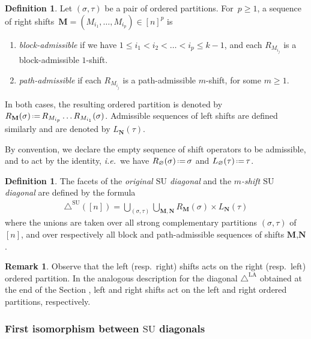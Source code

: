 \documentclass{amsart}
\newcommand{\darkblue}{\color{darkblue}} %
\newcommand{\Guillaume}[1]{\todo[color=magenta!30]{\rm #1 \\ \hfill --- G.}}
\theoremstyle{definition}
\newtheorem{definition}[theorem]{Definition}
\newtheorem{remark}[theorem]{Remark}
\newcommand{\eqdef}{\mbox{\,\raisebox{0.2ex}{\scriptsize\ensuremath{\mathrm:}}\ensuremath{=}\,}} %
\newcommand{\ie}{\textit{i.e.}~} %
\newcommand{\defn}[1]{\textsl{\darkblue #1}} %
\newcommand{\SU}{\mathrm{SU}}
\newcommand{\SUD}{\triangle^{\mathrm{SU}}}
\newcommand{\LAD}{\triangle^{\mathrm{LA}}}
\begin{document}
\begin{definition}
\label{def:admissible-shift-sequences}
Let $(\sigma,\tau)$ be a pair of ordered partitions. 
For~$p\geq 1$, a sequence of right shifts~$\textbf{M} = (M_{i_1},\dots,M_{i_p}) \in [n]^{p}$ is 
\begin{enumerate}
    \item \defn{block-admissible} if we have $1\leq i_1 < i_2 < \dots < i_p \leq k-1$, and each $R_{M_{i_j}}$ is a block-admissible $1$-shift.
    \item \defn{path-admissible} if each $R_{M_{i_j}}$ is a path-admissible $m$-shift, for some $m\geq 1$.
\end{enumerate}
In both cases, the resulting ordered partition is denoted by $R_\mathbf{M}(\sigma) \eqdef R_{M_{i_p}}\dots R_{M_{i_1}}(\sigma)$.
Admissible sequences of left shifts are defined similarly and are denoted by $L_\mathbf{N}(\tau)$.
\end{definition}

By convention, we declare the empty sequence of shift operators to be admissible, and to act by the identity, \ie we have $R_{\mathbf{\varnothing}}(\sigma)  \eqdef  \sigma$ and $L_{\mathbf{\varnothing}} (\tau) \eqdef  \tau$.

\begin{definition}
\label{def:classical-SU}
The facets of the \defn{original $\SU$ diagonal} and the \defn{$m$-shift $\SU$ diagonal} are defined by the formula
    \begin{align*}
        \SUD([n]) = \bigcup_{(\sigma,\tau)} \bigcup_{\mathbf{M}, \mathbf{N}} R_\mathbf{M}(\sigma)\times L_\mathbf{N}(\tau)
    \end{align*}
where the unions are taken over all strong complementary partitions $(\sigma, \tau)$ of $[n]$, and over respectively all block and path-admissible sequences of shifts $\textbf{M},\textbf{N}$.
\end{definition}

\begin{remark}
    Observe that the left (resp.~right) shifts acts on the right (resp.~left) ordered partition.
    In the analogous description for the diagonal $\LAD$ obtained at the end of the Section \Guillaume{[REF]}, left and right shifts act on the left and right ordered partitions, respectively. 
\end{remark}


\subsubsection{First isomorphism between $\SU$ diagonals}
\end{document}
